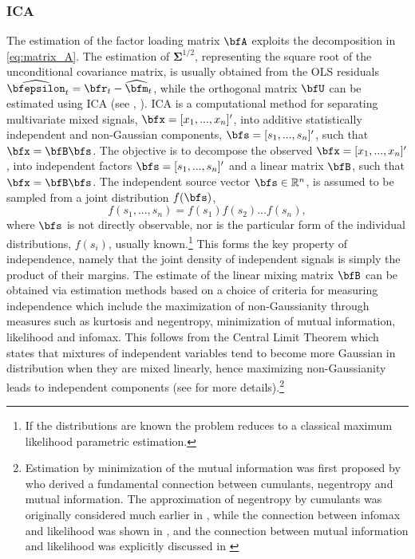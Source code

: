 \subsubsection{ICA}
The estimation of the factor loading matrix \( \bfA \) exploits the decomposition
in \eqref{eq:matrix_A}. The estimation of ${\mathbf{\Sigma}^{1/2}}$,
representing the square root of the unconditional covariance matrix, is usually
obtained from the OLS residuals \( \widehat{\bfepsilon}_t = \bfr_t - \widehat{\bfm}_t \),
while the orthogonal matrix $\bfU$ can be estimated using ICA (see \cite{Broda2009}, \cite{Zhang2009}).
ICA is a computational method for separating multivariate mixed signals, $\bfx=[x_1, ..., x_{n}]'$,
into additive statistically independent and non-Gaussian components, $\bfs=[s_1, ..., s_{n}]'$,
such that $\bfx=\bfB \bfs$. The objective is to decompose the observed $\bfx=[x_1, ..., x_{n}]'$,
into independent factors $\bfs=[s_1, ..., s_{n}]'$ and a linear matrix $\bfB$,
such that $\bfx=\bfB \bfs$. The independent source vector $\bfs \in {\mathbb{R}^n}$,
is assumed to be sampled from a joint distribution $f(\bfs)$,
\begin{equation}\label{eq:ica1}
f({s_1},...,{s_n}) = f({s_1})f({s_2})...f({s_n}),
\end{equation}
where $\bfs$ is not directly observable, nor is the particular form of the individual
distributions, $f(s_i)$, usually known.\footnote{If the distributions are known the
problem reduces to a classical maximum likelihood parametric estimation.} This forms
the key property of independence, namely that the joint density of independent signals
is simply the product of their margins. The estimate of the linear mixing matrix
$\bfB$ can be obtained via estimation methods based on a choice of criteria for
measuring independence which include the maximization of non-Gaussianity through
measures such as kurtosis and negentropy, minimization of mutual information,
likelihood and infomax. This follows from the Central Limit Theorem which states
that mixtures of independent variables tend to become more Gaussian in distribution
when they are mixed linearly, hence maximizing non-Gaussianity leads to independent
components (see \cite{Hyvaerinen2000} for more details).\footnote{Estimation by
minimization of the mutual information was first proposed by \cite{Comon1994}
who derived a fundamental connection between cumulants, negentropy and mutual information.
The approximation of negentropy by cumulants was originally considered much earlier
in \cite{Jones1987}, while the connection between infomax and likelihood
was shown in \cite{Pearlmutter1997}, and the connection between mutual
information and likelihood was explicitly discussed in \cite{Cardoso2000}}
